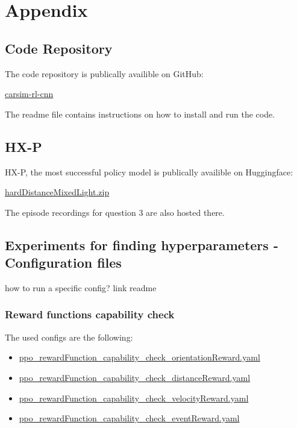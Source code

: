 \chapter{Appendix}
\label{cha:Appendix}

\section{Code Repository}

The code repository is publically availible on GitHub:

\href{https://github.com/geschnee/carsim-rl-cnn}{carsim-rl-cnn}

The readme file contains instructions on how to install and run the code.

\section{\ac{HX-P}}

\ac{HX-P}, the most successful policy model is publically availible on Huggingface:

\href{https://huggingface.co/geschnee/carsim-rl-cnn/blob/main/models/hardDistanceMixedLight.zip}{hardDistanceMixedLight.zip}


The episode recordings for question 3 are also hosted there.

\section{Experiments for finding hyperparameters - Configuration files}
\label{cha:experiment_configs}

how to run a specific config? link readme

\subsection{Reward functions capability check}
The used configs are the following:
\begin{itemize}
    \item \href{https://github.com/geschnee/carsim-rl-cnn/tree/main/python/cfg/ppo_rewardFunction_capability_check_orientationReward.yaml}{ppo\_rewardFunction\_capability\_check\_orientationReward.yaml}
    \item \href{https://github.com/geschnee/carsim-rl-cnn/tree/main/python/cfg/ppo_rewardFunction_capability_check_distanceReward.yaml}{ppo\_rewardFunction\_capability\_check\_distanceReward.yaml}
    \item \href{https://github.com/geschnee/carsim-rl-cnn/tree/main/python/cfg/ppo_rewardFunction_capability_check_velocityReward.yaml}{ppo\_rewardFunction\_capability\_check\_velocityReward.yaml}
    \item \href{https://github.com/geschnee/carsim-rl-cnn/tree/main/python/cfg/ppo_rewardFunction_capability_check_eventReward.yaml}{ppo\_rewardFunction\_capability\_check\_eventReward.yaml}
\end{itemize}


